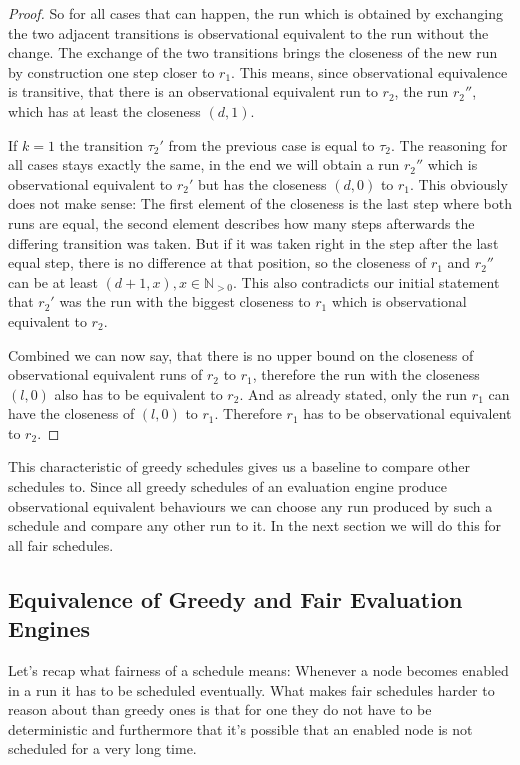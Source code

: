 \begin{proof}
  So for all cases that can happen, the run which is obtained by exchanging the two adjacent transitions is observational equivalent to the run without the change.
  The exchange of the two transitions brings the closeness of the new run by construction one step closer to \(r_1\).
  This means, since observational equivalence is transitive, that there is an observational equivalent run to \(r_2\), the run \(r_2''\),  which has at least the closeness \((d, 1)\).

  If \(k = 1\) the transition \(\tau_2'\) from the previous case is equal to \(\tau_2\).
  The reasoning for all cases stays exactly the same, in the end we will obtain a run \(r_2''\) which is observational equivalent to \(r_2'\) but has the closeness \((d, 0)\) to \(r_1\).
  This obviously does not make sense: The first element of the closeness is the last step where both runs are equal, the second element describes how many steps afterwards the differing transition was taken.
  But if it was taken right in the step after the last equal step, there is no difference at that position, so the closeness of \(r_1\) and \(r_2''\) can be at least \((d+1, x), x \in \mathbb{N}_{>0}\).
  This also contradicts our initial statement that \(r_2'\) was the run with the biggest closeness to \(r_1\) which is observational equivalent to \(r_2\).

  Combined we can now say, that there is no upper bound on the closeness of observational equivalent runs of \(r_2\) to \(r_1\), therefore the run with the closeness \((l, 0)\) also has to be equivalent to \(r_2\).
  And as already stated, only the run \(r_1\) can have the closeness of \((l, 0)\) to \(r_1\).
  Therefore \(r_1\) has to be observational equivalent to \(r_2\).
\end{proof}


This characteristic of greedy schedules gives us a baseline to compare other schedules to.
Since all greedy schedules of an evaluation engine produce observational equivalent behaviours we can choose any run produced by such a schedule and compare any other run to it.
In the next section we will do this for all fair schedules.

\subsection{Equivalence of Greedy and Fair Evaluation Engines}
\label{sec:behaviours:equivalence_without_timing:greedy_fair}

Let's recap what fairness of a schedule means: Whenever a node becomes enabled in a run it has to be scheduled eventually.
What makes fair schedules harder to reason about than greedy ones is that for one they do not have to be deterministic and furthermore that it's possible that an enabled node is not scheduled for a very long time.


